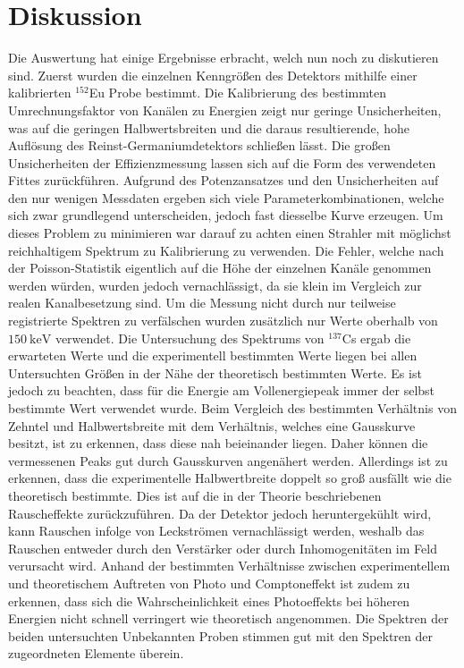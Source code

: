 
\section{Diskussion}
\label{sec:Diskussion}
Die Auswertung hat einige Ergebnisse erbracht, welch nun noch zu diskutieren sind. Zuerst wurden die einzelnen Kenngrößen des Detektors mithilfe einer kalibrierten $^{152}$Eu Probe bestimmt. Die Kalibrierung des bestimmten Umrechnungsfaktor von Kanälen zu Energien zeigt nur geringe Unsicherheiten, was auf die geringen Halbwertsbreiten und die daraus resultierende, hohe Auflösung des Reinst-Germaniumdetektors schließen lässt. Die großen Unsicherheiten der Effizienzmessung lassen sich auf die Form des verwendeten Fittes zurückführen. Aufgrund des Potenzansatzes und den Unsicherheiten auf den nur wenigen Messdaten ergeben sich viele Parameterkombinationen, welche sich zwar grundlegend unterscheiden, jedoch fast diesselbe Kurve erzeugen. Um dieses Problem zu minimieren war darauf zu achten einen Strahler mit möglichst reichhaltigem Spektrum zu Kalibrierung zu verwenden. Die Fehler, welche nach der Poisson-Statistik eigentlich auf die Höhe der einzelnen Kanäle genommen werden würden, wurden jedoch vernachlässigt, da sie klein im Vergleich zur realen Kanalbesetzung sind. Um die Messung nicht durch nur teilweise registrierte Spektren zu verfälschen wurden zusätzlich nur Werte oberhalb von $\SI{150}{\kilo\electronvolt}$ verwendet. Die Untersuchung des Spektrums von $^137$Cs ergab die erwarteten Werte und die experimentell bestimmten Werte liegen bei allen Untersuchten Größen in der Nähe der theoretisch bestimmten Werte. Es ist jedoch zu beachten, dass für die Energie am Vollenergiepeak immer der selbst bestimmte Wert verwendet wurde. Beim Vergleich des bestimmten Verhältnis von Zehntel und Halbwertsbreite mit dem Verhältnis, welches eine Gausskurve besitzt, ist zu erkennen, dass diese nah beieinander liegen. Daher können die vermessenen Peaks gut durch Gausskurven angenähert werden. Allerdings ist zu erkennen, dass die experimentelle Halbwertbreite doppelt so groß ausfällt wie die theoretisch bestimmte. Dies ist auf die in der Theorie beschriebenen Rauscheffekte zurückzuführen. Da der Detektor jedoch heruntergekühlt wird, kann Rauschen infolge von Leckströmen vernachlässigt werden, weshalb das Rauschen entweder durch den Verstärker oder durch Inhomogenitäten im Feld verursacht wird. Anhand der bestimmten Verhältnisse zwischen experimentellem und theoretischem Auftreten von Photo und Comptoneffekt ist zudem zu erkennen, dass sich die Wahrscheinlichkeit eines Photoeffekts bei höheren Energien nicht schnell verringert wie theoretisch angenommen. 
Die Spektren der beiden untersuchten Unbekannten Proben stimmen gut mit den Spektren der zugeordneten Elemente überein.